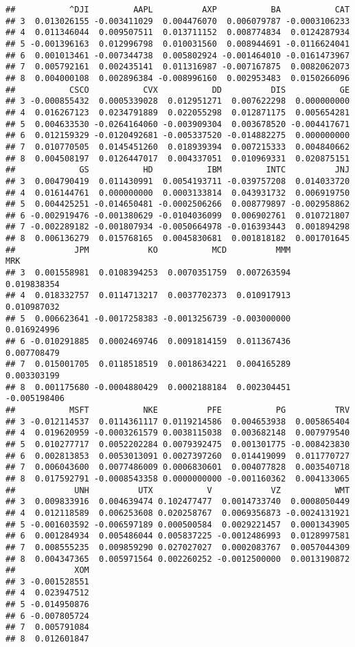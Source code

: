 \documentclass[
]{article}
\begin{document}
\begin{verbatim}
##           ^DJI         AAPL          AXP           BA           CAT
## 3  0.013026155 -0.003411029  0.004476070  0.006079787 -0.0003106233
## 4  0.011346044  0.009507511  0.013711152  0.008774834  0.0124287934
## 5 -0.001396163  0.012996798  0.010031560  0.008944691 -0.0116624041
## 6  0.001013461 -0.007344738  0.005802924 -0.001464010 -0.0161473967
## 7  0.005792161  0.002435141  0.011316987 -0.007167875  0.0082062073
## 8  0.004000108  0.002896384 -0.008996160  0.002953483  0.0150266096
##           CSCO           CVX           DD          DIS           GE
## 3 -0.000855432  0.0005339028  0.012951271  0.007622298  0.000000000
## 4  0.016267123  0.0234791889  0.022055298  0.012871175  0.005654281
## 5  0.004633530 -0.0264164060 -0.003909304  0.003678520 -0.004417671
## 6  0.012159329 -0.0120492681 -0.005337520 -0.014882275  0.000000000
## 7  0.010770505  0.0145451260  0.018939394  0.007215333  0.004840662
## 8  0.004508197  0.0126447017  0.004337051  0.010969331  0.020875151
##             GS           HD           IBM         INTC          JNJ
## 3  0.004790419  0.011430991  0.0054193711 -0.039757208  0.014033720
## 4  0.016144761  0.000000000  0.0003133814  0.043931732  0.006919750
## 5  0.004425251 -0.014650481 -0.0002506266  0.008779897 -0.002958862
## 6 -0.002919476 -0.001380629 -0.0104036099  0.006902761  0.010721807
## 7 -0.002289182 -0.001807934 -0.0050664978 -0.016393443  0.001894298
## 8  0.006136279  0.015768165  0.0045830681  0.001818182  0.001701645
##            JPM            KO           MCD          MMM          MRK
## 3  0.001558981  0.0108394253  0.0070351759  0.007263594  0.019838354
## 4  0.018332757  0.0114713217  0.0037702373  0.010917913  0.010987032
## 5  0.006623641 -0.0017258383 -0.0013256739 -0.003000000  0.016924996
## 6 -0.010291885  0.0002469746  0.0091814159  0.011367436  0.007708479
## 7  0.015001705  0.0118518519  0.0018634221  0.004165289  0.003303199
## 8  0.001175680 -0.0004880429  0.0002188184  0.002304451 -0.005198406
##           MSFT           NKE          PFE           PG          TRV
## 3 -0.012114537  0.0114361117 0.0119214586  0.004653938  0.005865404
## 4  0.019620959 -0.0003261579 0.0038115038  0.003682148  0.007979540
## 5  0.010277717  0.0052202284 0.0079392475  0.001301775 -0.008423830
## 6  0.002813853  0.0053013091 0.0027397260  0.014419099  0.011770727
## 7  0.006043600  0.0077486009 0.0006830601  0.004077828  0.003540718
## 8  0.017592791 -0.0008543358 0.0000000000 -0.001160362  0.004133065
##            UNH          UTX           V            VZ           WMT
## 3  0.009833916  0.004639474 0.102477477  0.0014733740  0.0008050449
## 4  0.012118589  0.006253608 0.020258767  0.0069356873 -0.0024131921
## 5 -0.001603592 -0.006597189 0.000500584  0.0029221457  0.0001343905
## 6  0.001284934  0.005486044 0.005837225 -0.0012486993  0.0128997581
## 7  0.008555235  0.009859290 0.027027027  0.0002083767  0.0057044309
## 8  0.004347365  0.005971564 0.002260252 -0.0012500000  0.0013190872
##            XOM
## 3 -0.001528551
## 4  0.023947512
## 5 -0.014950876
## 6 -0.007805724
## 7  0.005791084
## 8  0.012601847
\end{verbatim}
\end{document}
